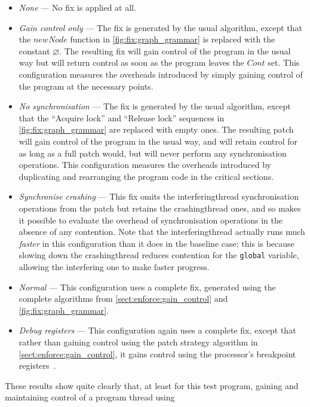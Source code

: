 \begin{itemize}
\item \textit{None} --- No fix is applied at all.
\item \textit{Gain control only} --- The fix is generated by the usual
  algorithm, except that the $\mathit{newNode}$ function in
  \autoref{fig:fix:graph_grammar} is replaced with the constant
  $\varnothing$.  The resulting fix will gain control of the program
  in the usual way but will return control as soon as the program
  leaves the $\mathit{Cont}$ set.  This configuration measures the
  overheads introduced by simply gaining control of the program at the
  necessary points.
\item \textit{No synchronisation} --- The fix is generated by the
  usual algorithm, except that the ``Acquire lock'' and ``Release
  lock'' sequences in \autoref{fig:fix:graph_grammar} are replaced
  with empty ones.  The resulting patch will gain control of the
  program in the usual way, and will retain control for as long as a
  full patch would, but will never perform any synchronisation
  operations.  This configuration measures the overheads introduced by
  duplicating and rearranging the program code in the critical
  sections.
\item \textit{Synchronise crashing} --- This fix omits the
  \gls{interferingthread} synchronisation operations from the patch
  but retains the \gls{crashingthread} ones, and so makes it possible
  to evaluate the overhead of synchronisation operations in the
  absence of any contention.  Note that the \gls{interferingthread}
  actually runs much \emph{faster} in this configuration than it does
  in the baseline case; this is because slowing down the
  \gls{crashingthread} reduces contention for the \texttt{global}
  variable, allowing the interfering one to make faster progress.
\item \textit{Normal} --- This configuration uses a complete fix,
  generated using the complete algorithms from
  \autoref{sect:enforce:gain_control} and
  \autoref{fig:fix:graph_grammar}.
\item \textit{Debug registers} --- This configuration again uses a
  complete fix, except that rather than gaining control using the
  patch strategy algorithm in \autoref{sect:enforce:gain_control}, it
  gains control using the processor's breakpoint
  registers~\cite[Chapter 16.2: Debug Registers]{Intel2009}.
\end{itemize}
These results show quite clearly that, at least for this test program,
gaining and maintaining control of a program thread using
